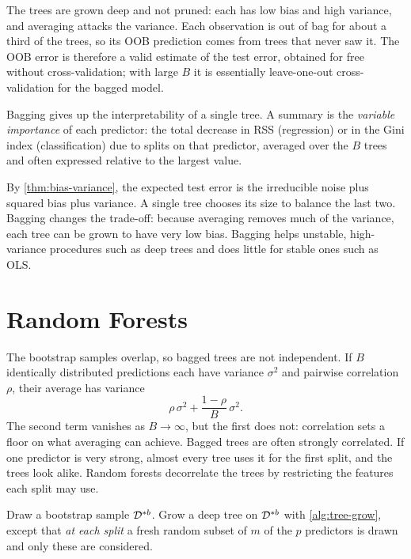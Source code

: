 The trees are grown deep and not pruned: each has low bias and high variance, and averaging attacks the variance. Each observation is out of bag for about a third of the trees, so its OOB prediction comes from trees that never saw it. The OOB error is therefore a valid estimate of the test error, obtained for free without cross-validation; with large $B$ it is essentially leave-one-out cross-validation for the bagged model.

Bagging gives up the interpretability of a single tree. A summary is the \emph{variable importance} of each predictor: the total decrease in RSS (regression) or in the Gini index (classification) due to splits on that predictor, averaged over the $B$ trees and often expressed relative to the largest value.

\begin{remark}
By \cref{thm:bias-variance}, the expected test error is the irreducible noise plus squared bias plus variance. A single tree chooses its size to balance the last two. Bagging changes the trade-off: because averaging removes much of the variance, each tree can be grown to have very low bias. Bagging helps unstable, high-variance procedures such as deep trees and does little for stable ones such as OLS.
\end{remark}

\section{Random Forests}\label{sec:random-forests}

The bootstrap samples overlap, so bagged trees are not independent. If $B$ identically distributed predictions each have variance $\sigma^2$ and pairwise correlation $\rho$, their average has variance
\[
\rho\,\sigma^2+\frac{1-\rho}{B}\,\sigma^2 .
\]
The second term vanishes as $B\to\infty$, but the first does not: correlation sets a floor on what averaging can achieve. Bagged trees are often strongly correlated. If one predictor is very strong, almost every tree uses it for the first split, and the trees look alike. Random forests decorrelate the trees by restricting the features each split may use.

\begin{algorithm}[H]
\caption{Random Forest}\label{alg:random-forest}
\begin{algorithmic}[1]
  \State Draw a bootstrap sample $\mathcal{D}^{*b}$.
  \State Grow a deep tree on $\mathcal{D}^{*b}$ with \cref{alg:tree-grow}, except that \emph{at each split} a fresh random subset of $m$ of the $p$ predictors is drawn and only these are considered.
\EndFor
{}
\end{algorithmic}
\end{algorithm}

